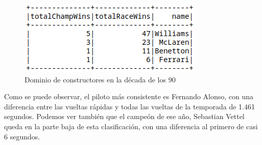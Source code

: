 \documentclass[12pt,twoside,titlepage]{report}
\begin{document}
\begin{figure}[H]
	\includegraphics[scale=0.4]{results/constructordominance/90sconstructordominance.png}
	\centering
	\caption{Dominio de constructores en la década de los 90}
	\label{fig:constdominance}
	\centering
\end{figure}


Como se puede observar, el piloto más consistente es Fernando Alonso, con una diferencia entre las vueltas rápidas y todas las vueltas de la temporada de 1.461 segundos. Podemos ver también que el campeón de ese año, Sebastian Vettel queda en la parte baja de esta clasificación, con una diferencia al primero de casi 6 segundos.



\end{document}
